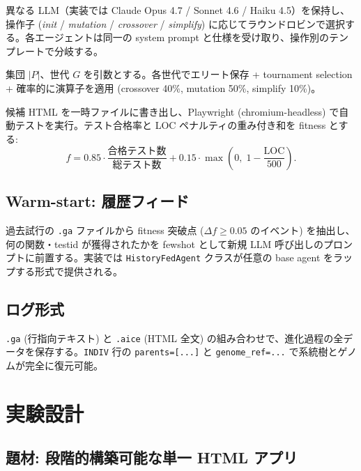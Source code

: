 \documentclass[a4paper,11pt]{ltjsarticle}
\begin{document}
\begin{description}[leftmargin=2em,itemsep=2pt]
  \item[(1) エージェント層] 異なる LLM（実装では Claude Opus 4.7 / Sonnet 4.6 / Haiku 4.5）を保持し、操作子 (\textit{init} / \textit{mutation} / \textit{crossover} / \textit{simplify}) に応じてラウンドロビンで選択する。各エージェントは同一の system prompt と仕様を受け取り、操作別のテンプレートで分岐する。
  \item[(2) GA ループ層] 集団 $|P|$、世代 $G$ を引数とする。各世代でエリート保存 + tournament selection + 確率的に演算子を適用 (crossover 40\%, mutation 50\%, simplify 10\%)。
  \item[(3) fitness ハーネス層] 候補 HTML を一時ファイルに書き出し、Playwright (chromium-headless) で自動テストを実行。テスト合格率と LOC ペナルティの重み付き和を fitness とする:
\[
f = 0.85 \cdot \frac{\text{合格テスト数}}{\text{総テスト数}} + 0.15 \cdot \max\!\left(0,\; 1 - \frac{\text{LOC}}{500}\right).
\]
\end{description}

\subsection{Warm-start: 履歴フィード}

過去試行の \texttt{.ga} ファイルから fitness 突破点 ($\Delta f \geq 0.05$ のイベント) を抽出し、何の関数・testid が獲得されたかを fewshot として新規 LLM 呼び出しのプロンプトに前置する。実装では \texttt{HistoryFedAgent} クラスが任意の base agent をラップする形式で提供される。

\subsection{ログ形式}

\texttt{.ga} (行指向テキスト) と \texttt{.aice} (HTML 全文) の組み合わせで、進化過程の全データを保存する。\texttt{INDIV} 行の \texttt{parents=[...]} と \texttt{genome\_ref=...} で系統樹とゲノムが完全に復元可能。

\section{実験設計}

\subsection{題材: 段階的構築可能な単一 HTML アプリ}
\end{document}
